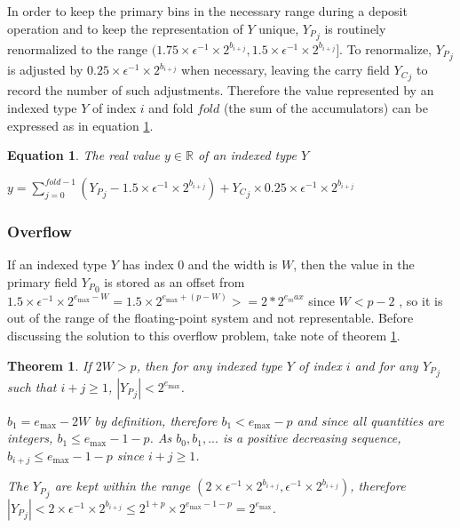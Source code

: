 \documentclass[12pt]{article}
\providecommand{\R}{\ensuremath{\mathbb{R}}}
\providecommand{\max}{\ensuremath{\text{max}}}
\theoremstyle{plain}
\newtheorem{thm}{Theorem}[section]
\newtheorem{eq}{Equation}[section]
\begin{document}
      In order to keep the primary bins in the necessary range during a deposit operation and to keep the representation of $Y$ unique, ${Y_P}_j$ is routinely renormalized to the range $(1.75 \times\epsilon^{-1} \times2^{b_{i + j}}, 1.5 \times\epsilon^{-1} \times2^{b_{i + j}}]$.
      To renormalize, ${Y_P}_j$ is adjusted by $0.25 \times\epsilon^{-1} \times 2^{b_{i + j}}$ when necessary, leaving the carry field ${Y_C}_j$ to record the number of such adjustments. Therefore the value represented by an indexed type $Y$ of index $i$ and fold $fold$ (the sum of the accumulators) can be expressed as in equation \ref{eq:indexedvalue}.
      \begin{eq} The real value $y \in \R$ of an indexed type $Y$

        $y = \sum\limits_{j = 0}^{fold - 1} ({Y_P}_j - 1.5 \times\epsilon^{-1}\times 2^{b_{i + j}}) + {Y_C}_j \times 0.25\times\epsilon^{-1}\times2^{b_{i + j}}$
        \label{eq:indexedvalue}
      \end{eq}
    \subsubsection{Overflow}
      \label{sec:overflow}
      If an indexed type $Y$ has index 0 and the width is $W$, then the value in the primary field ${Y_P}_0$ is stored as an offset from $1.5\times\epsilon^{-1}\times2^{e_{\max} - W} = 1.5 \times 2^{e_{\max} + (p - W)} >= 2 * 2^{e_max}$ since $W < p - 2$ \cite{repsum}, so it is out of the range of the floating-point system and not representable. Before discussing the solution to this overflow problem, take note of theorem \ref{thm:overflow}.
      \begin{thm}
        If $2W > p$, then for any indexed type $Y$ of index $i$ and for any ${Y_P}_j$ such that $i + j \geq 1$, $|{Y_P}_j| < 2^{e_{\max}}$.

        $b_1 = e_{\max} - 2W$ by definition, therefore $b_1 < e_{\max} - p$ and since all quantities are integers, $b_1 \leq e_{\max} - 1 - p$. As $b_0, b_1, ...$ is a positive decreasing sequence, $b_{i + j} \leq e_{\max} - 1 - p$ since $i + j \geq 1$.

        The ${Y_P}_j$ are kept within the range $(2 \times \epsilon^{-1} \times 2^{b_{i + j}}, \epsilon^{-1} \times 2^{b_{i + j}})$, therefore 
        $|{Y_P}_j| < 2 \times \epsilon^{-1} \times 2^{b_{i + j}} \leq 2^{1 + p} \times 2^{e_{\max} - 1 - p} = 2^{e_{\max}}$.

        \label{thm:overflow}
      \end{thm}
\end{document}
